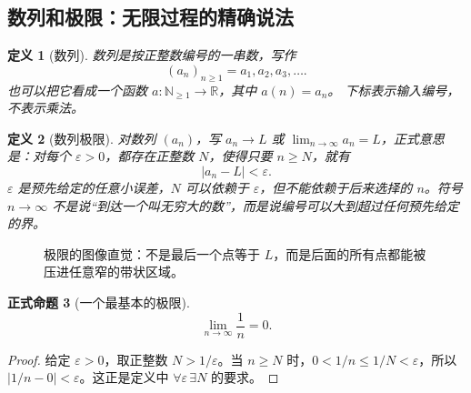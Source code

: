 \documentclass[UTF8,fontset=none,a4paper,11pt]{ctexart}
\theoremstyle{foundation-definition}
\newtheorem{definition}{定义}[section]
\theoremstyle{foundation-theorem}
\theoremstyle{foundation-proposition}
\newtheorem{proposition}[definition]{正式命题}
\theoremstyle{foundation-example}
\theoremstyle{foundation-remark}
\theoremstyle{foundation-theorem}
\begin{document}
\subsection{数列和极限：无限过程的精确说法}

\begin{definition}[数列]\label{def:sequence}
数列是按正整数编号的一串数，写作
\[
(a_n)_{n\ge1}=a_1,a_2,a_3,\ldots.
\]
也可以把它看成一个函数 \(a:\mathbb N_{\ge1}\to\mathbb R\)，其中 \(a(n)=a_n\)。
下标表示输入编号，不表示乘法。
\end{definition}

\begin{definition}[数列极限]\label{def:sequence-limit}
对数列 \((a_n)\)，写 \(a_n\to L\) 或 \(\lim_{n\to\infty}a_n=L\)，正式意思是：对每个 \(\varepsilon>0\)，都存在正整数 \(N\)，使得只要 \(n\ge N\)，就有
\[
|a_n-L|<\varepsilon.
\]
\(\varepsilon\) 是预先给定的任意小误差，\(N\) 可以依赖于 \(\varepsilon\)，但不能依赖于后来选择的 \(n\)。符号 \(n\to\infty\) 不是说“到达一个叫无穷大的数”，而是说编号可以大到超过任何预先给定的界。
\end{definition}

\begin{figure}[htbp]
\centering
{}
\caption{极限的图像直觉：不是最后一个点等于 \(L\)，而是后面的所有点都能被压进任意窄的带状区域。}
\label{fig:sequence-limit}
\end{figure}

\begin{proposition}[一个最基本的极限]\label{prop:one-over-n-limit}
\[
\lim_{n\to\infty}\frac1n=0.
\]
\end{proposition}

\begin{proof}
给定 \(\varepsilon>0\)，取正整数 \(N>1/\varepsilon\)。当 \(n\ge N\) 时，\(0<1/n\le1/N<\varepsilon\)，所以 \(|1/n-0|<\varepsilon\)。这正是定义中 \(\forall\varepsilon\,\exists N\) 的要求。
\end{proof}
\end{document}
